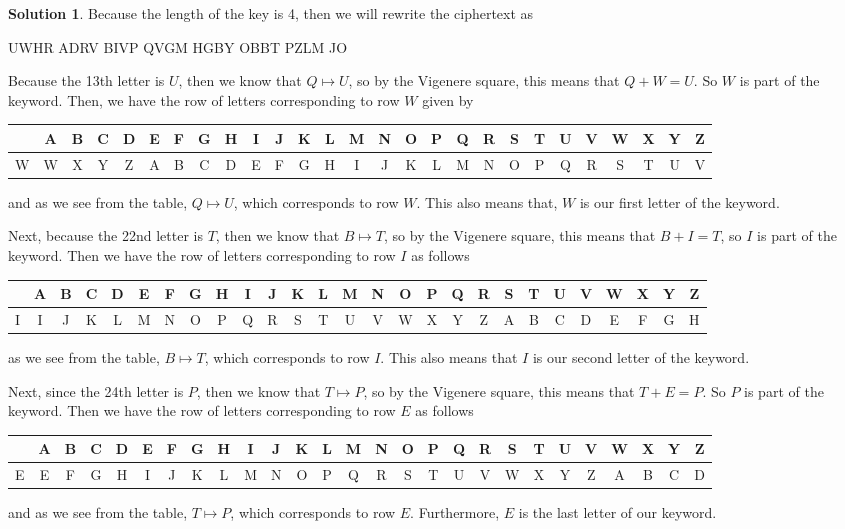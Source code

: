 \documentclass[11pt]{amsart}
\theoremstyle{definition}\newtheorem{question}{Question}
\theoremstyle{definition}\newtheorem*{solution}{Solution}
\begin{document}
\begin{solution}
    Because the length of the key is 4, then we will rewrite the ciphertext as
    \begin{center}
        \textsf{UWHR ADRV BIVP QVGM HGBY OBBT PZLM JO}
    \end{center}
    Because the 13th letter is $U$, then we know that $Q \mapsto U$, so by the Vigenere square, this means that $Q + W = U$. So $W$ is part of the keyword. Then, we have the row of letters corresponding to row $W$ given by
    \begin{center} \footnotesize
        \begin{tabular}{c|cccccccccccccccccccccccccc}
            & A & B & C & D & E & F & G & H & I & J & K & L & M & N & O & P & Q & R & S & T & U & V & W & X & Y & Z \\ \hline
            W & W & X & Y & Z & A & B & C & D & E & F & G & H & I & J & K & L & M & N & O & P & Q & R & S & T & U & V \\
        \end{tabular}
    \end{center}
    and as we see from the table, $Q \mapsto U$, which corresponds to row $W$. This also means that, $W$ is our first letter of the keyword.

    Next, because the 22nd letter is $T$, then we know that $B \mapsto T$, so by the Vigenere square, this means that $B + I = T$, so $I$ is part of the keyword. Then we have the row of letters corresponding to row $I$ as follows
    \begin{center} \footnotesize
        \begin{tabular}{c|cccccccccccccccccccccccccc}
            & A & B & C & D & E & F & G & H & I & J & K & L & M & N & O & P & Q & R & S & T & U & V & W & X & Y & Z \\ \hline
            I & I & J & K & L & M & N & O & P & Q & R & S & T & U & V & W & X & Y & Z & A & B & C & D & E & F & G & H \\
        \end{tabular}
    \end{center}
    as we see from the table, $B \mapsto T$, which corresponds to row $I$. This also means that $I$ is our second letter of the keyword.

    Next, since the 24th letter is $P$, then we know that $T \mapsto P$, so by the Vigenere square, this means that $T + E = P$. So $P$ is part of the keyword. Then we have the row of letters corresponding to row $E$ as follows
    \begin{center} \footnotesize
        \begin{tabular}{c|cccccccccccccccccccccccccc}
            & A & B & C & D & E & F & G & H & I & J & K & L & M & N & O & P & Q & R & S & T & U & V & W & X & Y & Z \\ \hline
            E & E & F & G & H & I & J & K & L & M & N & O & P & Q & R & S & T & U & V & W & X & Y & Z & A & B & C & D \\
        \end{tabular}
    \end{center}
    and as we see from the table, $T \mapsto P$, which corresponds to row $E$. Furthermore, $E$ is the last letter of our keyword.
    

\end{solution}
\end{document}
